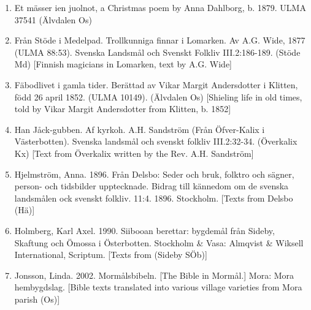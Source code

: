 \begin{enumerate}
\item 
Et mässer ien juolnot, a Christmas poem by Anna Dahlborg, b. 1879. ULMA 37541 (Älvdalen Os)
\item 
\label{bkm:Ref154302565}Från Stöde i Medelpad. Trollkunniga finnar i Lomarken. Av A.G. Wide, 1877 (ULMA 88:53). Svenska Landsmål och Svenskt Folkliv III.2:186-189. (Stöde Md) [Finnish magicians in Lomarken, text by A.G. Wide]
\item 
\label{bkm:Ref137882894}Fäbodlivet i gamla tider. Berättad av Vikar Margit Andersdotter i Klitten, född 26 april 1852. (ULMA 10149). (Älvdalen Os) [Shieling life in old times, told by Vikar Margit Andersdotter from Klitten, b. 1852]
\item 
\label{bkm:Ref137882216}Han Jåck-gubben. Af kyrkoh. A.H. Sandström (Från Öfver-Kalix i Västerbotten). Svenska landsmål och svenskt folkliv III.2:32-34. (Överkalix Kx) [Text from Överkalix written by the Rev. A.H. Sandström]

\item 
\label{bkm:Ref150576370}Hjelmström, Anna. 1896. Från Delsbo: Seder och bruk, folktro och sägner, person- och tidsbilder upptecknade. Bidrag till kännedom om de svenska landsmålen ock svenskt folkliv. 11:4. 1896. Stockholm. [Texts from Delsbo (Hä)]

\item 
\label{bkm:Ref154213910}Holmberg, Karl Axel. 1990. Siibooan berettar: bygdemål från Sideby, Skaftung och Ömossa i Österbotten. Stockholm \& Vasa: Almqvist \& Wiksell International, Scriptum. [Texts from (Sideby SÖb)]
\item 
\label{bkm:Ref150065702}\label{bkm:Ref261882727}Jonsson, Linda. 2002. Mormålsbibeln. [The Bible in Mormål.] Mora: Mora hembygdslag. [Bible texts translated into various village varieties from Mora parish (Os)] 


\end{enumerate}
